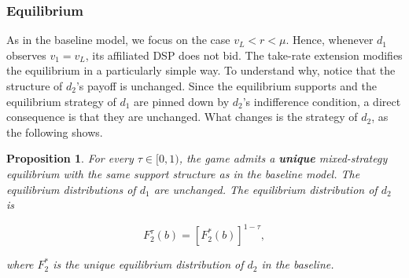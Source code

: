 \documentclass[11pt]{article}
\theoremstyle{plain}
\theoremstyle{definition}
\theoremstyle{plain}
\theoremstyle{plain}
\theoremstyle{plain}
\theoremstyle{plain}
\newtheorem{prop}[thm]{Proposition}
\numberwithin{equation}{section}
\begin{document}
\subsubsection{Equilibrium}

As in the baseline model, we focus on the case $ v_L < r < \mu $. Hence, whenever $ d_1 $ observes $ v_1 = v_L$, its affiliated DSP does not bid. The take-rate extension modifies the equilibrium in a particularly simple way. To understand why, notice that the structure of $ d_2 $'s payoff is unchanged. Since the equilibrium supports and the equilibrium strategy of $ d_1 $ are pinned down by $ d_2 $'s indifference condition, a direct consequence is that they are unchanged. What changes is the strategy of $ d_2 $, as the following shows.

\begin{prop}
For every $ \tau\in[0,1) $, the game admits a \textbf{unique} mixed-strategy equilibrium with the same support structure as in the baseline model. The equilibrium distributions of $ d_1 $ are unchanged. The equilibrium distribution of $ d_2 $ is

\[
F_2^\tau(b)=\left[F_2^*(b)\right]^{1-\tau},
\]

\vspace{0.2cm}

\noindent where $ F_2^* $ is the unique equilibrium distribution of $ d_2 $ in the baseline. 
\end{prop}
\end{document}
